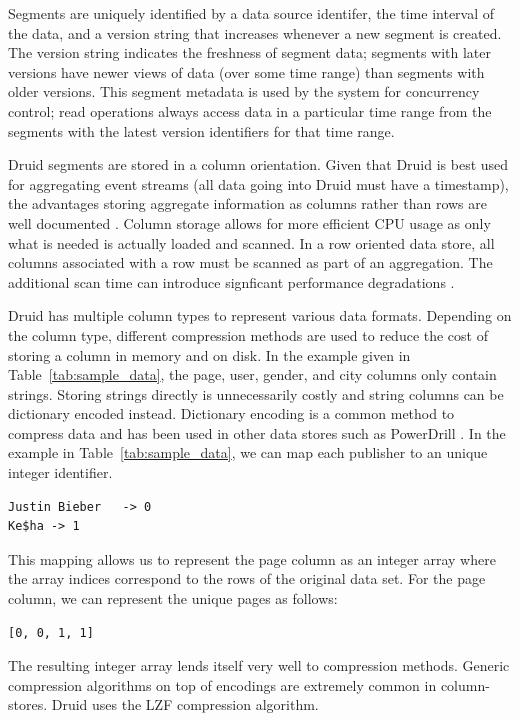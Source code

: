 \documentclass{acm_proc_article-sp}
\begin{document}
Segments are uniquely identified by a data source identifer, the time interval
of the data, and a version string that increases whenever a new segment is
created.  The version string indicates the freshness of segment data; segments
with later versions have newer views of data (over some time range) than
segments with older versions.  This segment metadata is used by the system for
concurrency control; read operations always access data in a particular time
range from the segments with the latest version identifiers for that time
range.

Druid segments are stored in a column orientation. Given that Druid is best
used for aggregating event streams (all data going into Druid must have a
timestamp), the advantages storing aggregate information as columns rather than
rows are well documented \cite{abadi2008column}. Column storage allows for more
efficient CPU usage as only what is needed is actually loaded and scanned. In a
row oriented data store, all columns associated with a row must be scanned as
part of an aggregation. The additional scan time can introduce signficant performance
degradations \cite{abadi2008column}.

Druid has multiple column types to represent various data formats. Depending on
the column type, different compression methods are used to reduce the cost of
storing a column in memory and on disk. In the example given in
Table~\ref{tab:sample_data}, the page, user, gender, and city columns only
contain strings. Storing strings directly is unnecessarily costly and string
columns can be dictionary encoded instead. Dictionary encoding is a common
method to compress data and has been used in other data stores such as
PowerDrill \cite{hall2012processing}. In the example in
Table~\ref{tab:sample_data}, we can map each publisher to an unique integer
identifier.
\begin{verbatim}
Justin Bieber   -> 0
Ke$ha -> 1
\end{verbatim}
This mapping allows us to represent the page column as an integer
array where the array indices correspond to the rows of the original
data set. For the page column, we can represent the unique
pages as follows:
\begin{verbatim}
[0, 0, 1, 1]
\end{verbatim}

The resulting integer array lends itself very well to
compression methods. Generic compression algorithms on top of encodings are
extremely common in column-stores. Druid uses the LZF \cite{liblzf2013} compression
algorithm.
\end{document}
